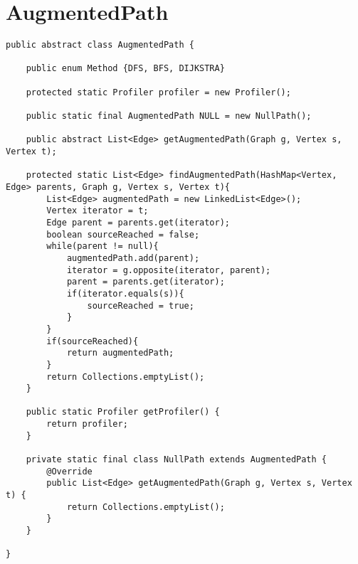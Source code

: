 \chapter{AugmentedPath}
\lstset{language=Java}
\begin{lstlisting}[caption=AugmentedPath Source Code]
public abstract class AugmentedPath {

	public enum Method {DFS, BFS, DIJKSTRA}
	
	protected static Profiler profiler = new Profiler();
	
	public static final AugmentedPath NULL = new NullPath();
	
	public abstract List<Edge> getAugmentedPath(Graph g, Vertex s, Vertex t);
	
	protected static List<Edge> findAugmentedPath(HashMap<Vertex, Edge> parents, Graph g, Vertex s, Vertex t){
		List<Edge> augmentedPath = new LinkedList<Edge>();
		Vertex iterator = t;
		Edge parent = parents.get(iterator);
		boolean sourceReached = false;
		while(parent != null){
			augmentedPath.add(parent);
			iterator = g.opposite(iterator, parent);
			parent = parents.get(iterator);
			if(iterator.equals(s)){
				sourceReached = true;
			}
		}
		if(sourceReached){
			return augmentedPath;
		}
		return Collections.emptyList();
	}

	public static Profiler getProfiler() {
		return profiler;
	}

	private static final class NullPath extends AugmentedPath {
		@Override
		public List<Edge> getAugmentedPath(Graph g, Vertex s, Vertex t) {
			return Collections.emptyList();
		}
	}
	
}
\end{lstlisting}